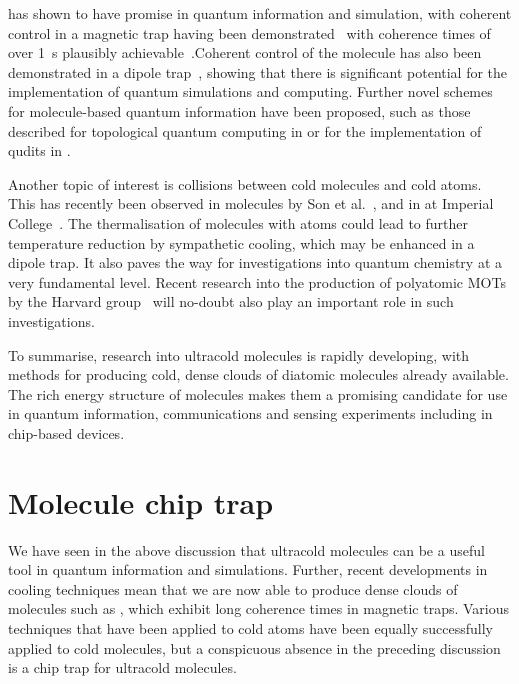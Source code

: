 \CaF{} has shown to have promise in quantum information and simulation, with
coherent control in a magnetic trap having been
demonstrated~\cite{WilliamsMagnetic2018, Blackmore_2018} with coherence times
of over \SI{1}{\second} plausibly
achievable~\cite{PhysRevLett.124.063001}.Coherent control of the molecule has
also been demonstrated in a dipole trap~\cite{PhysRevLett.127.123202}, showing
that there is significant potential for the implementation of quantum
simulations and computing. Further novel schemes for molecule-based quantum
information have been proposed, such as those described for topological quantum
computing in  or for the implementation of qudits in
.

Another topic of interest is collisions between cold molecules and cold atoms.
This has recently been observed in \NaLi{} molecules by Son et
al.~\cite{son2019collisional}, and in \CaF{} at Imperial
College~\cite{Jurgilas2021, JurgilasPRL_2021}. The thermalisation of molecules
with atoms could lead to further temperature reduction by sympathetic cooling,
which may be enhanced in a dipole trap. It also paves the way for
investigations into quantum chemistry at a very fundamental level. Recent
research into the production of polyatomic MOTs by the Harvard
group~\cite{DoylePolyatomic2022} will no-doubt also play an important role in
such investigations.

To summarise, research into ultracold molecules is rapidly developing, with
methods for producing cold, dense clouds of diatomic molecules already
available. The rich energy structure of molecules makes them a promising
candidate for use in quantum information, communications and sensing
experiments including in chip-based devices.

\section{Molecule chip trap}

We have seen in the above discussion that ultracold molecules can be a useful
tool in quantum information and simulations. Further, recent developments in
cooling techniques mean that we are now able to produce dense clouds of
molecules such as \CaF{}, which exhibit long coherence times in magnetic traps.
Various techniques that have been applied to cold atoms have been equally
successfully applied to cold molecules, but a conspicuous absence in the
preceding discussion is a chip trap for ultracold molecules.

